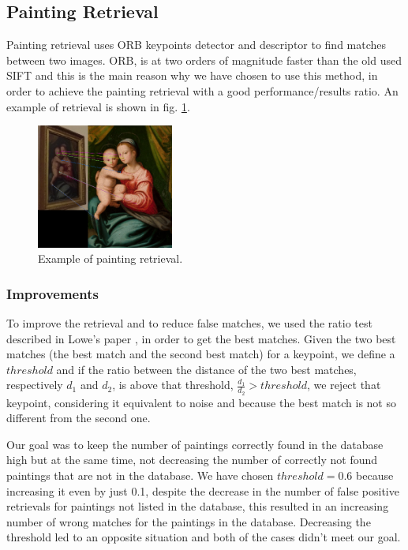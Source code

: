 \subsection{Painting Retrieval}
Painting retrieval uses ORB \cite{orb} keypoints detector and descriptor to find matches between two images. ORB, is at two orders of magnitude faster than the old used SIFT \cite{sift} and this is the main reason why we have chosen to use this method, in order to achieve the painting retrieval with a good performance/results ratio.
An example of retrieval is shown in fig. \ref{fig:retrieval_ex}.

\begin{figure}[h]
    \centering
    \includegraphics[width=0.4\textwidth]{pictures/painting_retrieval/retrieval}
    \caption{Example of painting retrieval.}
    \label{fig:retrieval_ex}
\end{figure}

\subsubsection{Improvements}
To improve the retrieval and to reduce false matches, we used the ratio test described in Lowe's paper \cite{sift}, in order to get the best matches. Given the two best matches (the best match and the second best match) for a keypoint, we define a \(threshold\) and if the ratio between the distance of the two best matches, respectively \(d_1\) and \(d_2\), is above that threshold, \(\frac{d_1}{d_2}>threshold\), we reject that keypoint, considering it equivalent to noise and because the best match is not so different from the second one.

Our goal was to keep the number of paintings correctly found in the database high but at the same time, not decreasing the number of correctly not found paintings that are not in the database. We have chosen \(threshold = 0.6\) because increasing it even by just 0.1, despite the decrease in the number of false positive retrievals for paintings not listed in the database, this resulted in an increasing number of wrong matches for the paintings in the database. Decreasing the threshold led to an opposite situation and both of the cases didn't meet our goal.

